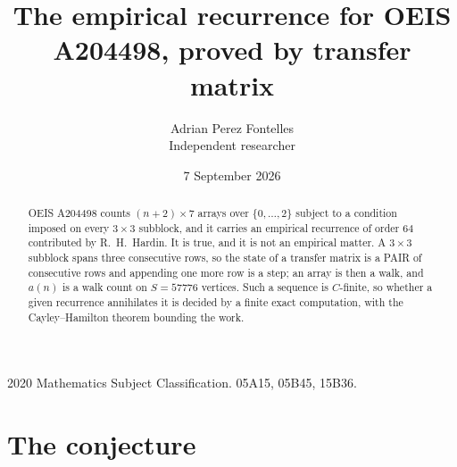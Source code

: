 \documentclass[11pt,a4paper]{article}
\title{The empirical recurrence for OEIS A204498, proved by transfer matrix}
\author{Adrian Perez Fontelles\\ \small Independent researcher}
\date{7 September 2026}
\theoremstyle{plain}
\theoremstyle{definition}
\begin{document}
\maketitle

\begin{abstract}
OEIS A204498 counts $(n+2)\times7$ arrays over $\{0,\dots,2\}$ subject to a condition imposed on
every $3\times3$ subblock, and it carries an empirical recurrence of order $64$
contributed by R.~H.~Hardin. It is true, and it is not an empirical matter. A $3\times3$
subblock spans three consecutive rows, so the state of a transfer matrix is a PAIR of
consecutive rows and appending one more row is a step; an array is then a walk, and
$a(n)$ is a walk count on $S=57776$ vertices. Such a sequence is $C$-finite, so whether a given
recurrence annihilates it is decided by a finite exact computation, with the Cayley--Hamilton
theorem bounding the work.
\end{abstract}

\noindent\small 2020 Mathematics Subject Classification. 05A15, 05B45, 15B36.\normalsize

\section{The conjecture}
\end{document}

